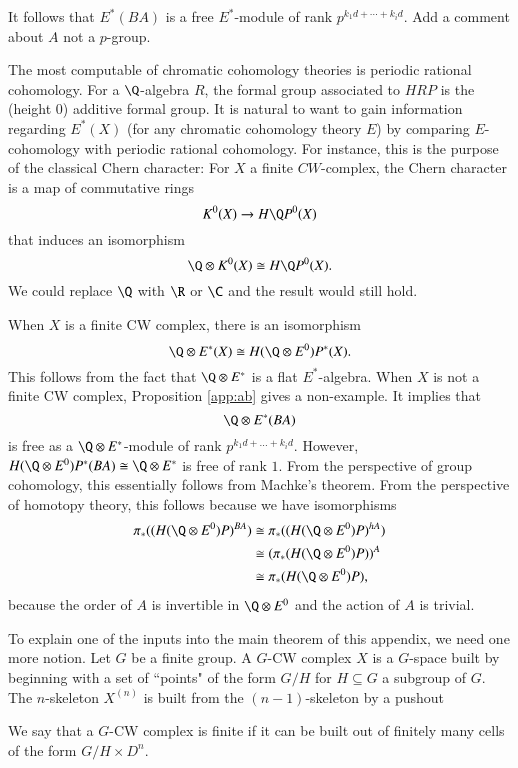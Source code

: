 It follows that $E^*(BA)$ is a free $E^*$-module of rank $p^{k_1d+\cdots + k_id}$. Add a comment about $A$ not a $p$-group.

The most computable of chromatic cohomology theories is periodic rational cohomology. For a $\Q$-algebra $R$, the formal group associated to $HRP$ is the (height $0$) additive formal group. It is natural to want to gain information regarding $E^*(X)$ (for any chromatic cohomology theory $E$) by comparing $E$-cohomology with periodic rational cohomology. For instance, this is the purpose of the classical Chern character: For $X$ a finite $CW$-complex, the Chern character is a map of commutative rings
\[
K^0(X) \to H\Q P^0(X)
\] 
that induces an isomorphism
\[
\Q \otimes K^0(X) \cong H\Q P^0(X).
\]
We could replace $\Q$ with $\R$ or $\C$ and the result would still hold.

When $X$ is a finite CW complex, there is an isomorphism
\begin{equation} \label{app:eqn}
\Q \otimes E^*(X) \cong H(\Q \otimes E^0)P^*(X).
\end{equation}
This follows from the fact that $\Q \otimes E^*$ is a flat $E^*$-algebra. When $X$ is not a finite CW complex, Proposition \ref{app:ab} gives a non-example. It implies that
\[
\Q \otimes E^*(BA)
\]
is free as a $\Q \otimes E^*$-module of rank $p^{k_1d + \ldots + k_id}$. However, $H(\Q \otimes E^0)P^*(BA) \cong \Q \otimes E^*$ is free of rank $1$. From the perspective of group cohomology, this essentially follows from Machke's theorem. From the perspective of homotopy theory, this follows because we have isomorphisms
\begin{align*}
\pi_*((H(\Q \otimes E^0)P)^{BA}) &\cong \pi_*((H(\Q \otimes E^0)P)^{hA}) \\ &\cong (\pi_*(H(\Q \otimes E^0)P))^A \\ &\cong \pi_*(H(\Q \otimes E^0)P),
\end{align*}
because the order of $A$ is invertible in $\Q \otimes E^0$ and the action of $A$ is trivial.

To explain one of the inputs into the main theorem of this appendix, we need one more notion. Let $G$ be a finite group. A $G$-CW complex $X$ is a $G$-space built by beginning with a set of ``points" of the form $G/H$ for $H \subseteq G$ a subgroup of $G$. The $n$-skeleton $X^{(n)}$ is built from the $(n-1)$-skeleton by a pushout
\begin{center}
\end{center}
We say that a $G$-CW complex is finite if it can be built out of finitely many cells of the form $G/H \times D^n$.

